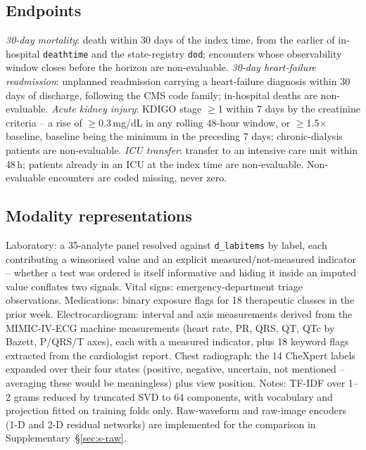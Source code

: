 \documentclass[11pt]{article}
\theoremstyle{definition}
\theoremstyle{remark}
\begin{document}
\subsection{Endpoints}

\emph{30-day mortality}: death within 30 days of the index time, from the earlier
of in-hospital \texttt{deathtime} and the state-registry \texttt{dod}; encounters
whose observability window closes before the horizon are non-evaluable.
\emph{30-day heart-failure readmission}: unplanned readmission carrying a
heart-failure diagnosis within 30 days of discharge, following the CMS code
family; in-hospital deaths are non-evaluable. \emph{Acute kidney injury}: KDIGO
stage $\ge$1 within 7 days by the creatinine criteria \citep{kdigo2012aki} --
a rise of $\ge$0.3\,mg/dL in any rolling 48-hour window, or $\ge$1.5$\times$
baseline, baseline being the minimum in the preceding 7 days; chronic-dialysis
patients are non-evaluable. \emph{ICU transfer}: transfer to an intensive care
unit within 48\,h; patients already in an ICU at the index time are
non-evaluable. Non-evaluable encounters are coded missing, never zero.

\subsection{Modality representations}

Laboratory: a 35-analyte panel resolved against \texttt{d\_labitems} by label,
each contributing a winsorised value and an explicit measured/not-measured
indicator -- whether a test was ordered is itself informative and hiding it
inside an imputed value conflates two signals. Vital signs: emergency-department
triage observations. Medications: binary exposure flags for 18 therapeutic
classes in the prior week. Electrocardiogram: interval and axis measurements
derived from the MIMIC-IV-ECG machine measurements (heart rate, PR, QRS, QT,
QTc by Bazett, P/QRS/T axes), each with a measured indicator, plus 18 keyword
flags extracted from the cardiologist report. Chest radiograph: the 14 CheXpert
labels \citep{irvin2019chexpert} expanded over their four states (positive,
negative, uncertain, not mentioned -- averaging these would be meaningless) plus
view position. Notes: TF-IDF over 1--2 grams reduced by truncated SVD to 64
components, with vocabulary and projection fitted on training folds only.
Raw-waveform and raw-image encoders (1-D and 2-D residual networks) are
implemented for the comparison in Supplementary~\S\ref{sec:s-raw}.
\end{document}

